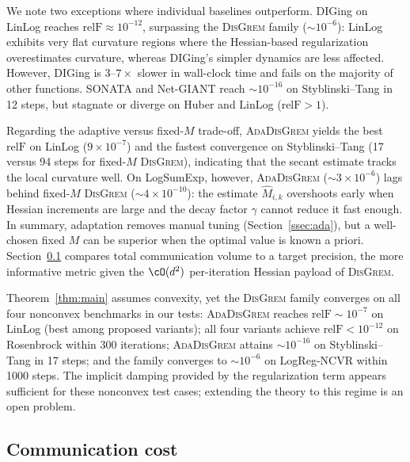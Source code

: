 \documentclass[review,onefignum,onetabnum]{siamart171218}
\begin{document}
	We note two exceptions where individual baselines outperform.
	DIGing on LinLog reaches $\mathrm{relF}\approx10^{-12}$, surpassing
	the \textsc{DisGrem} family ($\sim10^{-6}$):
	LinLog exhibits very flat curvature regions where
	the Hessian-based regularization overestimates curvature,
	whereas DIGing's simpler dynamics are less affected.
	However, DIGing is $3$--$7\times$ slower in wall-clock time
	and fails on the majority of other functions.
	SONATA and Net-GIANT reach $\sim10^{-16}$ on
	Styblinski--Tang in 12 steps, but stagnate or diverge on
	Huber and LinLog ($\mathrm{relF}>1$).

	Regarding the adaptive versus fixed-$M$ trade-off,
	\textsc{AdaDisGrem} yields the best $\mathrm{relF}$ on LinLog
	($9{\times}10^{-7}$) and the fastest convergence on
	Styblinski--Tang (17 versus 94 steps for fixed-$M$
	\textsc{DisGrem}), indicating that the secant estimate
	tracks the local curvature well.
	On LogSumExp, however, \textsc{AdaDisGrem}
	($\sim3{\times}10^{-6}$) lags behind fixed-$M$
	\textsc{DisGrem} ($\sim4{\times}10^{-10}$):
	the estimate $\hat M_{i,k}$ overshoots early when Hessian
	increments are large and the decay factor $\gamma$ cannot
	reduce it fast enough.
	In summary, adaptation removes manual tuning
	(Section~\ref{ssec:ada}), but a well-chosen fixed $M$ can
	be superior when the optimal value is known a priori.
	Section~\ref{ssec:commexp} compares total communication
	volume to a target precision, the more informative metric
	given the $\cO(d^2)$ per-iteration Hessian payload of \textsc{DisGrem}.

	Theorem~\ref{thm:main} assumes convexity, yet the \textsc{DisGrem}
	family converges on all four nonconvex benchmarks in our tests:
	\textsc{AdaDisGrem} reaches $\mathrm{relF}\sim10^{-7}$ on LinLog (best
	among proposed variants); all four variants achieve
	$\mathrm{relF}<10^{-12}$ on Rosenbrock within 300 iterations;
	\textsc{AdaDisGrem} attains $\sim10^{-16}$ on Styblinski--Tang in
	17 steps; and the family converges to $\sim10^{-6}$ on
	LogReg-NCVR within 1000 steps.
	The implicit damping provided by the regularization term appears
	sufficient for these nonconvex test cases; extending the theory
	to this regime is an open problem.
	
	\FloatBarrier
	\subsection{Communication cost}\label{ssec:commexp}
	
\end{document}
